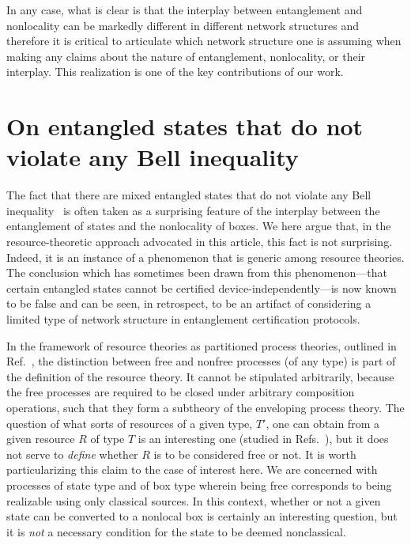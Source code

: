 \documentclass[prx,11pt,letterpaper,twocolumn,accepted=2023-11-27]{quantumarticle}
\theoremstyle{plain}
\theoremstyle{definition}
\begin{document}
In any case, what is clear is that the  interplay between entanglement and nonlocality can be markedly different in different network structures and therefore it is critical to articulate which network structure one is assuming when making any claims about the nature of entanglement, nonlocality, or their interplay. 
This realization is one of the key contributions of our work.


\section{On entangled states that do not violate any Bell inequality}\label{Werner}


The fact that there are mixed entangled states that do not violate any Bell inequality~\cite{werner1989quantum,Barrettlocal}  is often taken as a surprising feature of the interplay between the entanglement of states and the nonlocality of boxes.  We here argue that, in the resource-theoretic approach advocated in this article, this fact is not surprising.  Indeed, it is an instance of a phenomenon that is generic among resource theories.  The conclusion which has sometimes been drawn from this phenomenon---that certain entangled states cannot be certified device-independently---is now known to be false and can be seen, in retrospect, to be an artifact of considering a limited type of 
network structure
in entanglement certification protocols. 



In the framework of resource theories as partitioned process theories, outlined in Ref.~\cite{coecke2016mathematical}, the distinction between free and nonfree processes (of any type) is part of the definition of the resource theory. It cannot be stipulated arbitrarily, because the free processes are required to be closed under arbitrary composition operations, such that they form a subtheory of the enveloping process theory.  The question of what sorts of resources of a given type, $T'$, one can obtain from a given resource $R$ of type $T$ is an interesting one (studied in Refs.~\cite{semiquantum,rosset2020characterizing}), but it does not serve to {\em define} whether $R$ is to be considered free or not.  
It is worth particularizing this claim to the case of interest here.  We are concerned with processes of state type and of box type wherein being free corresponds to being  realizable  using only classical sources.  In this context, whether or not a given state can be converted to a nonlocal box is certainly an interesting question, but it is {\em not} a necessary condition for the state to be deemed nonclassical. 
\end{document}

